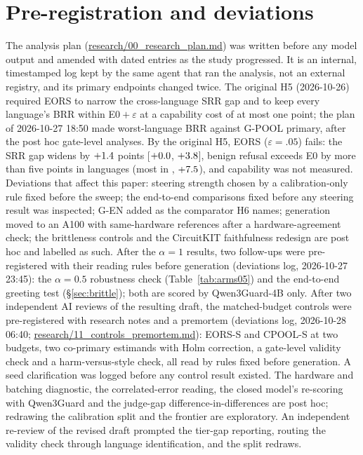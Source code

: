 \documentclass{article}
\newcommand{\ci}[2]{{\small[$#1$, $#2$]}}
\begin{document}
\section{Pre-registration and deviations}
\label{app:prereg}
The analysis plan (\url{research/00_research_plan.md}) was written before any model output and amended with dated entries as the study progressed. It is an internal, timestamped log kept by the same agent that ran the analysis, not an external registry, and its primary endpoints changed twice. The original H5 (2026-10-26) required EORS to narrow the cross-language SRR gap and to keep every language's BRR within E0${}+\varepsilon$ at a capability cost of at most one point; the plan of 2026-10-27 18:50 made worst-language BRR against G-POOL primary, after the post hoc gate-level analyses. By the original H5, EORS ($\varepsilon{=}.05$) fails: the SRR gap widens by $+1.4$ points \ci{\EorsQGapSrrLo}{\EorsQGapSrrHi}, benign refusal exceeds E0 by more than five points in \EorsExcessNAbove{} languages (most in \EorsExcessMaxLang, $+7.5$), and capability was not measured. Deviations that affect this paper: steering strength chosen by a calibration-only rule fixed before the sweep; the end-to-end comparisons fixed before any steering result was inspected; G-EN added as the comparator H6 names; generation moved to an A100 with same-hardware references after a hardware-agreement check; the brittleness controls and the CircuitKIT faithfulness redesign are post hoc and labelled as such. After the $\alpha{=}1$ results, two follow-ups were pre-registered with their reading rules before generation (deviations log, 2026-10-27 23:45): the $\alpha{=}0.5$ robustness check (Table~\ref{tab:arms05}) and the end-to-end greeting test (\S\ref{sec:brittle}); both are scored by Qwen3Guard-4B only. After two independent AI reviews of the resulting draft, the matched-budget controls were pre-registered with research notes and a premortem (deviations log, 2026-10-28 06:40; \url{research/11_controls_premortem.md}): EORS-S and CPOOL-S at two budgets, two co-primary estimands with Holm correction, a gate-level validity check and a harm-versus-style check, all read by rules fixed before generation. A seed clarification was logged before any control result existed. The hardware and batching diagnostic, the correlated-error reading, the closed model's re-scoring with Qwen3Guard and the judge-gap difference-in-differences are post hoc; redrawing the calibration split and the frontier are exploratory. An independent re-review of the revised draft prompted the tier-gap reporting, routing the validity check through language identification, and the split redraws.
\end{document}
